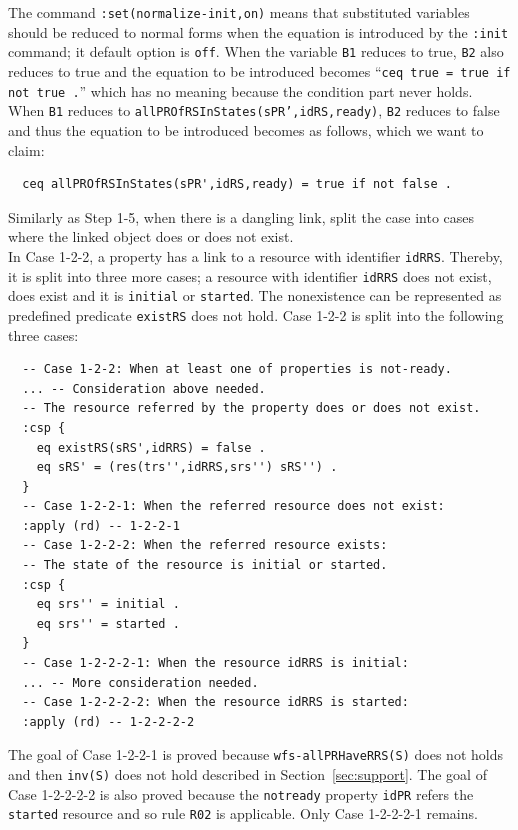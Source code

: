 \documentclass[12pt]{report}
\newcommand{\stt}[1]{{\small{\tt {#1}}}}
\begin{document}
The command \stt{:set(normalize-init,on)} means that substituted
variables should be reduced to normal forms when the equation is
introduced by the {\tt :init} command; it default option is {\tt off}.
When the variable {\tt B1} reduces to true, {\tt B2} also reduces to
true and the equation to be introduced becomes ``\stt{ceq true = true if
  not true .}''  which has no meaning because the condition part never
holds.  When {\tt B1} reduces to
\stt{allPROfRSInStates(sPR',idRS,ready)}, {\tt B2} reduces to false
and thus the equation to be introduced becomes as follows, which we
want to claim:
\small
\begin{verbatim}
  ceq allPROfRSInStates(sPR',idRS,ready) = true if not false .
\end{verbatim}
\normalsize

\vspace{0.3cm}
 Similarly as Step 1-5, when there is a
dangling link, split the case into cases where the linked object does
or does not exist. \\ In Case 1-2-2, a property has a link to a
resource with identifier {\tt idRRS}. Thereby, it is split into three
more cases; a resource with identifier {\tt idRRS} does not exist,
does exist and it is {\tt initial} or {\tt started}. The nonexistence
can be represented as predefined predicate {\tt existRS} does not
hold. Case 1-2-2 is split into the following three cases:
\small
\begin{verbatim}
  -- Case 1-2-2: When at least one of properties is not-ready.
  ... -- Consideration above needed.
  -- The resource referred by the property does or does not exist.
  :csp {
    eq existRS(sRS',idRRS) = false .
    eq sRS' = (res(trs'',idRRS,srs'') sRS'') .
  }
  -- Case 1-2-2-1: When the referred resource does not exist:
  :apply (rd) -- 1-2-2-1
  -- Case 1-2-2-2: When the referred resource exists:
  -- The state of the resource is initial or started.
  :csp { 
    eq srs'' = initial .
    eq srs'' = started .
  }
  -- Case 1-2-2-2-1: When the resource idRRS is initial:
  ... -- More consideration needed.
  -- Case 1-2-2-2-2: When the resource idRRS is started:
  :apply (rd) -- 1-2-2-2-2
\end{verbatim}
\normalsize
The goal of Case 1-2-2-1 is proved because \stt{wfs-allPRHaveRRS(S)}
does not holds and then \stt{inv(S)} does not hold described in
Section~\ref{sec:support}.  The goal of Case 1-2-2-2-2 is also proved
because the {\tt notready} property {\tt idPR} refers the {\tt
  started} resource and so rule {\tt R02} is applicable.  Only Case
1-2-2-2-1 remains.\\
\end{document}
